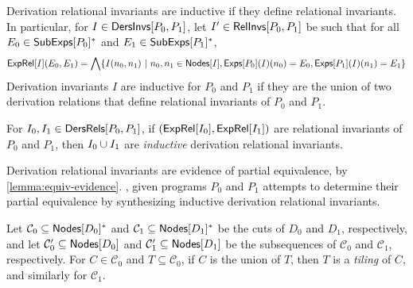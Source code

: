 %
Derivation relational invariants are inductive if they define
relational invariants.
%
In particular, for $I \in \mathsf{DersInvs}[ P_0, P_1 ]$, let $I' \in
\mathsf{RelInvs}[ P_0, P_1 ]$ be such that for all $E_0 \in \mathsf{SubExps}[ P_0 ]^{*}$
and $E_1 \in \mathsf{SubExps}[ P_1 ]^{*}$,
\begin{align*}
  \exprel{I}(E_0, E_1) = %
  \bigland \setformer{ I(n_0, n_1) }{ %
    n_0, n_1 \in \nodes{I},
    \dersexps{P_0}{I}(n_0) = E_0, \dersexps{P_1}{I}(n_1) = E_1 }
\end{align*}
%
Derivation invariants $I$ are inductive for $P_0$ and $P_1$ if they
are the union of two derivation relations that define relational
invariants of $P_0$ and $P_1$.
%
\begin{defn}
  \label{defn:inductive-der-rels}
  For $I_0, I_1 \in \mathsf{DersRels}[ P_0, P_1 ]$, if $(\mathsf{ExpRel}[ I_0 ],
  \mathsf{ExpRel}[ I_1 ])$ are relational invariants of $P_0$ and $P_1$, then
  $I_0 \cup I_1$ are \emph{inductive} derivation relational
  invariants.
\end{defn}
%
Derivation relational invariants are evidence of partial equivalence,
by \autoref{lemma:equiv-evidence}.
%
\sys, given programs $P_0$ and $P_1$ attempts to determine their
partial equivalence by synthesizing inductive derivation relational
invariants.

%
Let $\mathcal{C}_0 \subseteq \mathsf{Nodes}[ D_0 ]^{*}$ and $\mathcal{C}_1
\subseteq \mathsf{Nodes}[ D_1 ]^{*}$ be the cuts of $D_0$ and $D_1$,
respectively, and let $\mathcal{C}_0' \subseteq \mathsf{Nodes}[ D_0 ]$ and
$\mathcal{C}_1' \subseteq \mathsf{Nodes}[ D_1 ]$ be the subsequences of
$\mathcal{C}_0$ and $\mathcal{C}_1$, respectively.
%
For $C \in \mathcal{C}_0$ and $T \subseteq \mathcal{C}_0$, if $C$ is
the union of $T$, then $T$ is a \emph{tiling} of $C$, and similarly
for $\mathcal{C}_1$.

